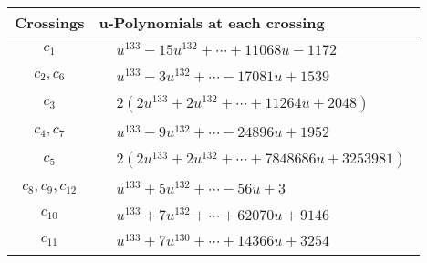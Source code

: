 \documentclass[1p]{elsarticle_modified}
\theoremstyle{definition}
\begin{document}
\begin{tabular}{m{50pt}|m{274pt}}
Crossings & \hspace{64pt}u-Polynomials at each crossing \\
\hline $$\begin{aligned}c_{1}\end{aligned}$$&$\begin{aligned}
&u^{133}-15 u^{132}+\cdots+11068 u-1172
\end{aligned}$\\
\hline $$\begin{aligned}c_{2},c_{6}\end{aligned}$$&$\begin{aligned}
&u^{133}-3 u^{132}+\cdots-17081 u+1539
\end{aligned}$\\
\hline $$\begin{aligned}c_{3}\end{aligned}$$&$\begin{aligned}
&2(2 u^{133}+2 u^{132}+\cdots+11264 u+2048)
\end{aligned}$\\
\hline $$\begin{aligned}c_{4},c_{7}\end{aligned}$$&$\begin{aligned}
&u^{133}-9 u^{132}+\cdots-24896 u+1952
\end{aligned}$\\
\hline $$\begin{aligned}c_{5}\end{aligned}$$&$\begin{aligned}
&2(2 u^{133}+2 u^{132}+\cdots+7848686 u+3253981)
\end{aligned}$\\
\hline $$\begin{aligned}c_{8},c_{9},c_{12}\end{aligned}$$&$\begin{aligned}
&u^{133}+5 u^{132}+\cdots-56 u+3
\end{aligned}$\\
\hline $$\begin{aligned}c_{10}\end{aligned}$$&$\begin{aligned}
&u^{133}+7 u^{132}+\cdots+62070 u+9146
\end{aligned}$\\
\hline $$\begin{aligned}c_{11}\end{aligned}$$&$\begin{aligned}
&u^{133}+7 u^{130}+\cdots+14366 u+3254
\end{aligned}$\\
\hline
\end{tabular}\\~\\
\end{document}
